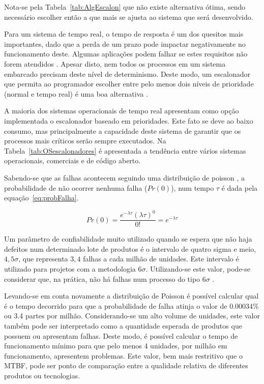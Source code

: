 \documentclass[12pt,openright,oneside,a4paper,brazil]{abntex2}
\begin{document}
Nota-se pela Tabela~\ref{tab:AlgEscalon} que não existe alternativa ótima, sendo necessário escolher então a que mais se ajusta ao sistema que será desenvolvido.

Para um sistema de tempo real, o tempo de resposta é um dos quesitos mais importantes, dado que a perda de um prazo pode impactar negativamente no funcionamento deste. Algumas aplicações podem falhar se estes requisitos não forem atendidos \cite{reneaux1999}. Apesar disto, nem todos os processos em um sistema embarcado precisam deste nível de determinismo. Deste modo, um escalonador que permita ao programador escolher entre pelo menos dois níveis de prioridade (normal e tempo real) é uma boa alternativa \cite{peek2013complexity}.

A maioria dos sistemas operacionais de tempo real apresentam como opção implementada o escalonador baseado em prioridades. Este fato se deve ao baixo consumo, mas principalmente a capacidade deste sistema de garantir que os processos mais críticos serão sempre executados. Na Tabela~\ref{tab:OSescalonadores} é apresentada a tendência entre vários sistemas operacionais, comerciais e de código aberto. 

Sabendo-se que as falhas acontecem seguindo uma distribuição de poisson \cite{li2006model}, a probabilidade de não ocorrer nenhuma falha ($Pr(0)$), num tempo $\tau$ é dada pela equação~\ref{eq:probFalha}.

\begin{equation}\label{eq:probFalha}
Pr(0) = \frac{e^{-\lambda \tau} (\lambda \tau)^0}{0!} = e^{-\lambda \tau}
\end{equation}

Um parâmetro de confiabilidade muito utilizado \cite{breyfogle2003implementing} quando se espera que não haja defeitos num determinado lote de produtos é o intervalo de quatro sigma e meio, $4,5\sigma$, que representa $3,4$ falhas a cada milhão de unidades. Este intervalo é utilizado para projetos com a metodologia $6\sigma$. Utilizando-se este valor, pode-se considerar que, na prática, não há falhas num processo do tipo $6\sigma$ \cite{geoff2001six}.

Levando-se em conta novamente a distribuição de Poisson é possível calcular qual é o tempo decorrido para que a probabilidade de falha atinja o valor de 0.00034\% ou 3.4 partes por milhão. Considerando-se um alto volume de unidades, este valor também pode ser interpretado como a quantidade esperada de produtos que possuem ou apresentam falhas. Deste modo, é possível calcular o tempo de funcionamento mínimo para que pelo menos 4 unidades, por milhão em funcionamento, apresentem problemas. Este valor, bem mais restritivo que o MTBF, pode ser ponto de comparação entre a qualidade relativa de diferentes produtos ou tecnologias. 
\end{document}
